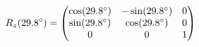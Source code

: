 \documentclass[preview]{standalone}
\begin{document}
\begin{align*}
\special{dvisvgm:raw <g id='unique000'>}R_z(29.8^\circ) = \begin{pmatrix} \cos(29.8^\circ) & -\sin(29.8^\circ) & 0 \\ \sin(29.8^\circ) & \cos(29.8^\circ) & 0 \\ 0 & 0 & 1 \end{pmatrix}\special{dvisvgm:raw </g>}
\end{align*}
\end{document}
